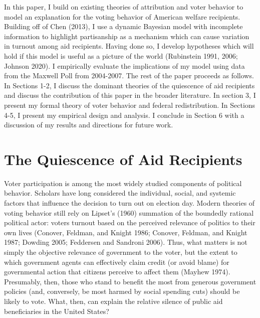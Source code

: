 \documentclass[12pt]{paper}
\begin{document}
In this paper, I build on existing theories of attribution and voter behavior to model an explanation for the voting behavior of American welfare recipients. Building off of Chen (2013), I use a dynamic Bayesian model with incomplete information to highlight partisanship as a mechanism which can cause variation in turnout among aid recipients. Having done so, I develop hypotheses which will hold if this model is useful as a picture of the world (Rubinstein 1991, 2006; Johnson 2020). I empirically evaluate the implications of my model using data from the Maxwell Poll from 2004-2007. The rest of the paper proceeds as follows. In Sections 1-2, I discuss the dominant theories of the quiescence of aid recipients and discuss the contribution of this paper in the broader literature. In section 3, I present my formal theory of voter behavior and federal redistribution. In Sections 4-5, I present my empirical design and analysis. I conclude in Section 6 with a discussion of my results and directions for future work.


\section{The Quiescence of Aid Recipients}
Voter participation is among the most widely studied components of political behavior. Scholars have long considered the individual, social, and systemic factors that influence the decision to turn out on election day. Modern theories of voting behavior still rely on Lipset’s (1960) summation of the boundedly rational political actor: voters turnout based on the perceived relevance of politics to their own lives (Conover, Feldman, and Knight 1986; Conover, Feldman, and Knight 1987; Dowding 2005; Feddersen and Sandroni 2006). Thus, what matters is not simply the objective relevance of government to the voter, but the extent to which government agents can effectively claim credit (or avoid blame) for governmental action that citizens perceive to affect them (Mayhew 1974). Presumably, then, those who stand to benefit the most from generous government policies (and, conversely, be most harmed by social spending cuts) should be likely to vote. What, then, can explain the relative silence of public aid beneficiaries in the United States?
\end{document}
